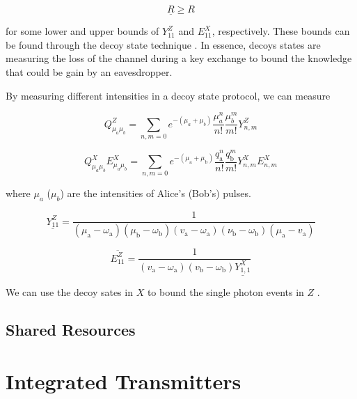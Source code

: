 \begin{equation}
	\underline{R} \geq R
\end{equation}

for some lower and upper bounds of $Y_{11}^Z$ and $E_{11}^X$, respectively. These bounds can be found through the decoy state technique \cite{}. In essence, decoys states are measuring the loss of the channel during a key exchange to bound the knowledge that could be gain by an eavesdropper. 

By measuring different intensities in a decoy state protocol, we can measure

\begin{equation}
	Q_{\mu_a \mu_b}^Z = \sum_{n,m=0} e^{-(\mu_a + \mu_b)}\frac{\mu_a^n}{n!}\frac{\mu_b^m}{m!} Y_{n,m}^Z
\end{equation}

\begin{equation}
	Q_{\mu_{a} \mu_{b}}^X E^{X}_{\mu_{a} \mu_{b}}=\sum_{n, m=0} e^{-\left(\mu_{\mathrm{a}}+\mu_{\mathrm{b}}\right)} \frac{q_{\mathrm{a}}^{n}}{n !} \frac{q_{\mathrm{b}}^{m}}{m !} Y^{X}_{n, m} E^{X}_{n, m}
\end{equation}

where $\mu_a$ ($\mu_b$) are the intensities of Alice's (Bob's) pulses.

\begin{equation}
	\underline{Y_{11}^Z} = \frac{1}{\left(\mu_{\mathrm{a}}-\omega_{\mathrm{a}}\right)\left(\mu_{\mathrm{b}}-\omega_{\mathrm{b}}\right)\left(v_{\mathrm{a}}-\omega_{\mathrm{a}}\right)\left(\nu_{\mathrm{b}}-\omega_{\mathrm{b}}\right)\left(\mu_{\mathrm{a}}-v_{\mathrm{a}}\right)}
\end{equation}

\begin{equation}
	\overline{E_{11}^Z} = \frac{1}{\left(v_{\mathrm{a}}-\omega_{\mathrm{a}}\right)\left(v_{\mathrm{b}}-\omega_{\mathrm{b}}\right) \underline{Y^{X}_{1,1}}}
\end{equation}

We can use the decoy sates in $X$ to bound the single photon events in $Z$ \cite{zhou2016}.

\subsection{Shared Resources}

\section{Integrated Transmitters}

